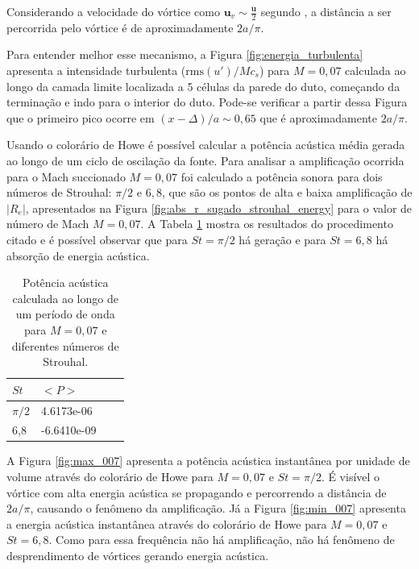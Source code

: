 \begin{figure}[ht!]
\centering
  
\end{figure}

\newpage

\begin{figure}[ht!]
\centering
  
\end{figure}

Considerando a velocidade do vórtice como $\textbf{u}_{v} \sim \frac{\textbf{u}}{2}$ segundo , a distância a ser percorrida pelo vórtice é de aproximadamente $2a/\pi$. 

Para entender melhor esse mecanismo, a Figura \ref{fig:energia_turbulenta} apresenta a intensidade turbulenta ($\text{rms}(u')/Mc_{s}$) para $M = 0,07$ calculada ao longo da camada limite localizada a 5 células da parede do duto, começando da terminação e indo para o interior do duto. Pode-se verificar a partir dessa Figura que o primeiro pico ocorre em $(x - \Delta)/a \sim 0,65$ que é aproximadamente $2a/\pi$.


Usando o colorário de Howe é possível calcular a potência acústica média gerada ao longo de um ciclo de oscilação da fonte. Para analisar a amplificação ocorrida para o Mach succionado $M = 0,07$ foi calculado a potência sonora para dois números de Strouhal: $\pi/2$ e $6,8$, que são os pontos de alta e baixa amplificação de $|R_{e}|$, apresentados na Figura \ref{fig:abs_r_sugado_strouhal_energy} para o valor de número de Mach $M = 0,07$. A Tabela \ref{table:potencia} mostra os resultados do procedimento citado e é possível observar que para $St = \pi/2$ há geração e para $St = 6,8$ há absorção de energia acústica. 

\newpage
\begin{table}[ht!]
\centering
\caption{Potência acústica calculada ao longo de um período de onda para $M = 0,07$ e diferentes números de Strouhal.}
\label{table:potencia}
    \begin{tabular}{|l|l|l|l|}
        \hline
        $St$ & $<P>$ \\ \hline
        $\pi/2$ & 4.6173e-06  \\ \hline  
        6,8 & -6.6410e-09 \\ \hline
    \end{tabular}
\end{table} 


A Figura \ref{fig:max_007} apresenta a potência acústica instantânea por unidade de volume através do colorário de Howe para $M = 0,07$ e $St = \pi/2$. É visível o vórtice com alta energia acústica se propagando e percorrendo a distância de $2a/\pi$, causando o fenômeno da amplificação. Já a Figura \ref{fig:min_007} apresenta a energia acústica instantânea através do colorário de Howe para $M = 0,07$ e $St = 6,8$. Como para essa frequência não há amplificação, não há fenômeno de desprendimento de vórtices gerando energia acústica.   

